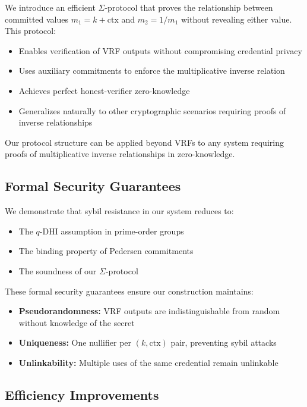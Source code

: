 We introduce an efficient $\Sigma$-protocol that proves the relationship between committed values $m_1 = k+\text{ctx}$ and $m_2 = 1/m_1$ without revealing either value. This protocol:

\begin{itemize}
    \item Enables verification of VRF outputs without compromising credential privacy
    \item Uses auxiliary commitments to enforce the multiplicative inverse relation
    \item Achieves perfect honest-verifier zero-knowledge
    \item Generalizes naturally to other cryptographic scenarios requiring proofs of inverse relationships
\end{itemize}

Our protocol structure can be applied beyond VRFs to any system requiring proofs of multiplicative inverse relationships in zero-knowledge.

\subsection{Formal Security Guarantees}

We demonstrate that sybil resistance in our system reduces to:
\begin{itemize}
    \item The $q$-DHI assumption in prime-order groups
    \item The binding property of Pedersen commitments
    \item The soundness of our $\Sigma$-protocol
\end{itemize}

These formal security guarantees ensure our construction maintains:
\begin{itemize}
    \item \textbf{Pseudorandomness:} VRF outputs are indistinguishable from random without knowledge of the secret
    \item \textbf{Uniqueness:} One nullifier per $(k,\text{ctx})$ pair, preventing sybil attacks
    \item \textbf{Unlinkability:} Multiple uses of the same credential remain unlinkable
\end{itemize}

\subsection{Efficiency Improvements}

